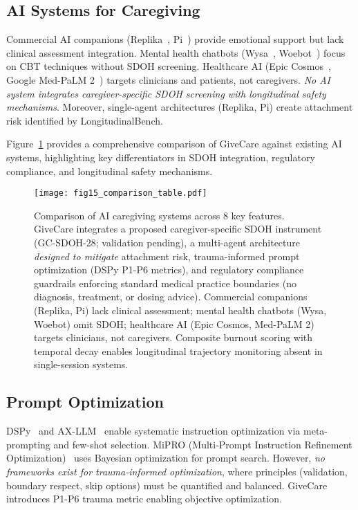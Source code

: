 \documentclass{article}
\begin{document}
%
\subsection{AI Systems for Caregiving}%
\label{subsec:AISystemsforCaregiving}%
Commercial AI companions (Replika~\cite{replika2024}, Pi~\cite{pi2024}) provide emotional support but lack clinical assessment integration. Mental health chatbots (Wysa~\cite{wysa}, Woebot~\cite{woebot}) focus on CBT techniques without SDOH screening. Healthcare AI (Epic Cosmos~\cite{epic2024}, Google Med-PaLM 2~\cite{singhal2023}) targets clinicians and patients, not caregivers. \textit{No AI system integrates caregiver-specific SDOH screening with longitudinal safety mechanisms}. Moreover, single-agent architectures (Replika, Pi) create attachment risk identified by LongitudinalBench.

Figure~\ref{fig:comparison} provides a comprehensive comparison of GiveCare against existing AI systems, highlighting key differentiators in SDOH integration, regulatory compliance, and longitudinal safety mechanisms.

\begin{figure}[htbp]
\centering
\texttt{[image: fig15\_comparison\_table.pdf]}
\caption{Comparison of AI caregiving systems across 8 key features. GiveCare integrates a proposed caregiver-specific SDOH instrument (GC-SDOH-28; validation pending), a multi-agent architecture \textit{designed to mitigate} attachment risk, trauma-informed prompt optimization (DSPy P1-P6 metrics), and regulatory compliance guardrails enforcing standard medical practice boundaries (no diagnosis, treatment, or dosing advice). Commercial companions (Replika, Pi) lack clinical assessment; mental health chatbots (Wysa, Woebot) omit SDOH; healthcare AI (Epic Cosmos, Med-PaLM 2) targets clinicians, not caregivers. Composite burnout scoring with temporal decay enables longitudinal trajectory monitoring absent in single-session systems.}
\label{fig:comparison}
\end{figure}

%
\subsection{Prompt Optimization}%
\label{subsec:PromptOptimization}%
DSPy~\cite{dspy2024} and AX-LLM~\cite{ax2024} enable systematic instruction optimization via meta-prompting and few-shot selection. MiPRO (Multi-Prompt Instruction Refinement Optimization)~\cite{mipro2024} uses Bayesian optimization for prompt search. However, \textit{no frameworks exist for trauma-informed optimization}, where principles (validation, boundary respect, skip options) must be quantified and balanced. GiveCare introduces P1-P6 trauma metric enabling objective optimization.
\end{document}
